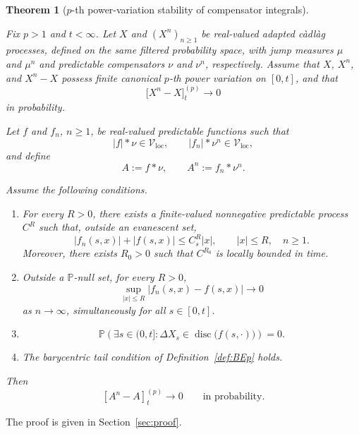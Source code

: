 \documentclass[a4paper,10pt]{article}
\newtheorem{thm}{Theorem}[section]
\renewcommand{\P}{\mathbb P}
\begin{document}
\begin{thm}
[\(p\)-th power-variation stability of compensator integrals]
\label{thm:CMC-pvar-compensator-stability}

Fix \(p>1\) and \(t<\infty\). Let \(X\) and
\((X^n)_{n\ge1}\) be real-valued adapted
càdlàg processes, defined on the same filtered probability space,
with jump measures \(\mu\) and \(\mu^n\) and predictable compensators
\(\nu\) and \(\nu^n\), respectively. Assume that \(X\), \(X^n\), and
\(X^n-X\) possess finite canonical \(p\)-th power variation on
\([0,t]\), and that
\[
        \bigl[X^n-X\bigr]^{(p)}_t
        \longrightarrow0
\]
in probability.


Let \(f\) and \(f_n\), \(n\ge1\), be real-valued predictable functions
such that
\[
        |f|*\nu\in\mathcal V_{\mathrm{loc}},
        \qquad
        |f_n|*\nu^n\in\mathcal V_{\mathrm{loc}},
\]
and define
\[
        A:=f*\nu,
        \qquad
        A^n:=f_n*\nu^n.
\]

Assume the following conditions.

\begin{enumerate}

\item[\textnormal{(LG$_0$)}]
For every \(R>0\), there exists a finite-valued nonnegative predictable
process \(C^R\) such that, outside an evanescent set,
\[
        |f_n(s,x)|+|f(s,x)|
        \le C^R_s|x|,
        \qquad |x|\le R,\quad n\ge1.
\]
Moreover, there exists \(R_0>0\) such that \(C^{R_0}\) is locally
bounded in time.

\item[\textnormal{(LU)}]
Outside a \(\P\)-null set, for every \(R>0\),
\[
        \sup_{|x|\le R}
        |f_n(s,x)-f(s,x)|
        \longrightarrow0
\]
as \(n\to\infty\), simultaneously for all \(s\in[0,t]\).

\item[\textnormal{(JC)}]
\[
\P\left(
        \exists s\in(0,t]:
        \Delta X_s\in
        \operatorname{disc}\bigl(f(s,\cdot)\bigr)
\right)=0.
\]
\item[\textnormal{(\(\mathrm{BE}_p\))}]
The barycentric tail condition of
Definition~\ref{def:BEp} holds.

\end{enumerate}

Then
\[
        [A^n-A]^{(p)}_t
        \longrightarrow0
        \qquad\text{in probability}.
\]
\end{thm}

\noindent
The proof is given in Section~\ref{sec:proof}.
\end{document}
